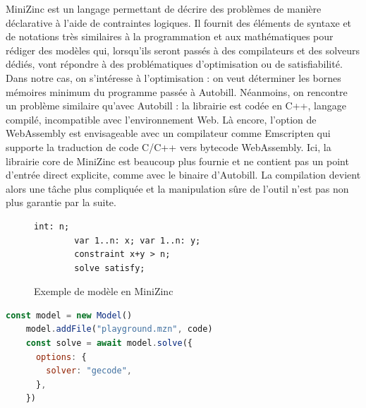 \documentclass[12pt]{article}
\begin{document}
MiniZinc est un langage permettant de décrire des problèmes de manière déclarative à l'aide de contraintes logiques. Il fournit des éléments de syntaxe et de notations très similaires à la programmation et aux mathématiques pour rédiger des modèles qui, lorsqu'ils seront passés à des compilateurs et des solveurs dédiés, vont répondre à des problématiques d'optimisation ou de satisfiabilité. Dans notre cas, on s'intéresse à l'optimisation : on veut déterminer les bornes mémoires minimum du programme passée à Autobill.
Néanmoins, on rencontre un problème similaire qu'avec Autobill : la librairie est codée en C++, langage compilé, incompatible avec l'environnement Web. Là encore, l'option de WebAssembly est envisageable avec un compilateur comme Emscripten qui supporte la traduction de code C/C++ vers bytecode WebAssembly. Ici, la librairie core de MiniZinc est beaucoup plus fournie et ne contient pas un point d'entrée direct explicite, comme avec le binaire d'Autobill. La compilation devient alors une tâche plus compliquée et la manipulation sûre de l'outil n'est pas non plus garantie par la suite.
\begin{figure}[!b]
      \centering
      \begin{lstlisting}[language=minizinc]
        int: n;
        var 1..n: x; var 1..n: y;
        constraint x+y > n;
        solve satisfy;
    \end{lstlisting}
      \caption{Exemple de modèle en MiniZinc}
      \label{Simple modèle pour déterminer la satisfiabilité d'une équation}
\end{figure} \newpage
\begin{lstlisting}[language=javascript]
    const model = new Model()
    model.addFile("playground.mzn", code)
    const solve = await model.solve({
      options: {
        solver: "gecode",
      },
    })
\end{lstlisting}
\iffalse
\end{document}
